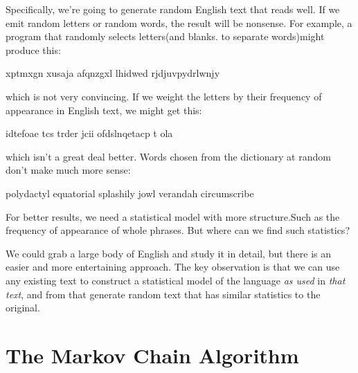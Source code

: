 Specifically, we're going to generate random English text that reads well.
If we emit random letters or random words, the result will be nonsense. For
example, a program that randomly selects letters(and blanks. to separate
words)might produce this:
\begin{wellcode}
    xptmxgn xusaja afqnzgxl lhidwed rjdjuvpydrlwnjy
\end{wellcode}
which is not very convincing. If we weight the letters by their frequency
of appearance in English text, we might get this:
\begin{wellcode}
    idtefoae tcs trder jcii ofdslnqetacp t ola
\end{wellcode}
which isn't a great deal better. Words chosen from the dictionary at random
don't make much more sense:
\begin{wellcode}
    polydactyl equatorial splashily jowl verandah circumscribe
\end{wellcode}
For better results, we need a statistical model with more structure.Such as
the frequency of appearance of whole phrases. But where can we find such
statistics?

We could grab a large body of English and study it in detail, but there is
an easier and more entertaining approach. The key observation is that we
can use any existing text to construct a statistical model of the language
\textit{as used} in \textit{that text}, and from that generate random text
that has similar statistics to the original.

\section{The Markov Chain Algorithm}
\label{sec:the_markov_chain_algorithm}

